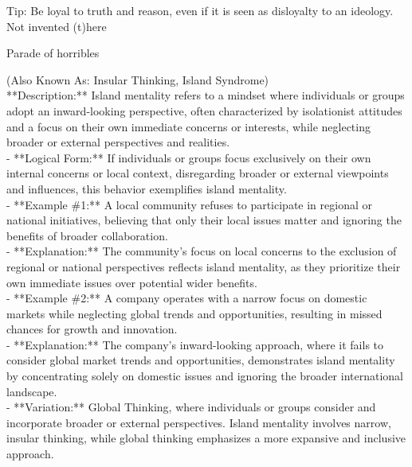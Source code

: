 \documentclass[a4paper,12pt,single,pdftex]{scrartcl}
\begin{document}
      
        Tip: Be loyal to truth and reason, even if it is seen as disloyalty to an ideology.
      \\

    
  

Not invented (t)here

Parade of horribles
    
      (Also Known As: Insular Thinking, Island Syndrome)
    \\

  
    
       **Description:** Island mentality refers to a mindset where individuals or groups adopt an inward-looking perspective, often characterized by isolationist attitudes and a focus on their own immediate concerns or interests, while neglecting broader or external perspectives and realities.
    \\

    
      - **Logical Form:** If individuals or groups focus exclusively on their own internal concerns or local context, disregarding broader or external viewpoints and influences, this behavior exemplifies island mentality.
    \\

    
      - **Example \#1:** A local community refuses to participate in regional or national initiatives, believing that only their local issues matter and ignoring the benefits of broader collaboration.
    \\

    
      - **Explanation:** The community’s focus on local concerns to the exclusion of regional or national perspectives reflects island mentality, as they prioritize their own immediate issues over potential wider benefits.
    \\

    
      - **Example \#2:** A company operates with a narrow focus on domestic markets while neglecting global trends and opportunities, resulting in missed chances for growth and innovation.
    \\

    
      - **Explanation:** The company’s inward-looking approach, where it fails to consider global market trends and opportunities, demonstrates island mentality by concentrating solely on domestic issues and ignoring the broader international landscape.
    \\

    
      - **Variation:** Global Thinking, where individuals or groups consider and incorporate broader or external perspectives. Island mentality involves narrow, insular thinking, while global thinking emphasizes a more expansive and inclusive approach.
    \\
\end{document}
